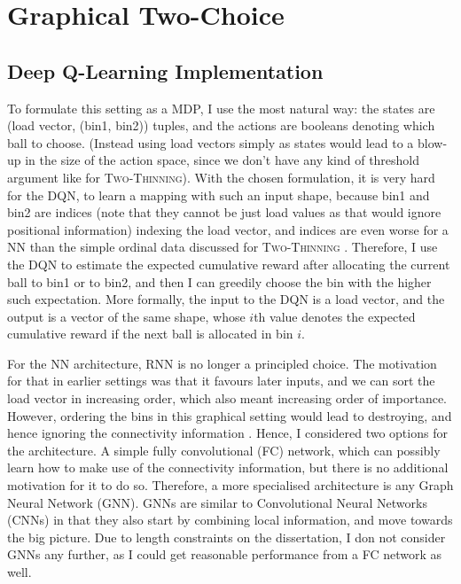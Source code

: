 \section{Graphical Two-Choice}



\subsection{Deep Q-Learning Implementation} \label{graphical-DQN}

To formulate this setting as a MDP, I use the most natural way: the states are (load vector, (bin1, bin2)) tuples, and the actions are booleans denoting which ball to choose. (Instead using load vectors simply as states would lead to a blow-up in the size of the action space, since we don't have any kind of threshold argument like for \textsc{Two-Thinning}). With the chosen formulation, it is very hard for the DQN, to learn a mapping with such an input shape, because bin1 and bin2 are indices (note that they cannot be just load values as that would ignore positional information) indexing the load vector, and indices are even worse for a NN than the simple ordinal data discussed for \textsc{Two-Thinning} . Therefore, I use the DQN to estimate the expected cumulative reward after allocating the current ball to bin1 or to bin2, and then I can greedily choose the bin with the higher such expectation. More formally, the input to the DQN is a load vector, and the output is a vector of the same shape, whose $i$th value denotes the expected cumulative reward if the next ball is allocated in bin $i$.  


For the NN architecture, RNN is no longer a principled choice. The motivation for that in earlier settings was that it favours later inputs, and we can sort the load vector in increasing order, which also meant increasing order of importance. However, ordering the bins in this graphical setting would lead to destroying, and hence ignoring the connectivity information . Hence, I considered two options for the architecture. A simple fully convolutional (FC) network, which can possibly learn how to make use of the connectivity information, but there is no additional motivation for it to do so. Therefore, a more specialised architecture is any Graph Neural Network (GNN). GNNs are similar to Convolutional Neural Networks (CNNs) in that they also start by combining local information, and move towards the big picture. Due to length constraints on the dissertation, I don not consider GNNs any further, as I could get reasonable performance from a FC network as well. 



